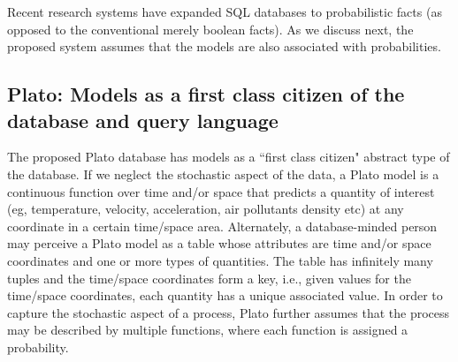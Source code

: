 Recent research systems have expanded SQL databases to probabilistic facts (as opposed to the conventional merely boolean facts). As we discuss next, the proposed system assumes that the models are also associated with probabilities.


\subsection{Plato: Models as a first class citizen of the database and query language}
\label{sec:plato}
The proposed Plato database has models as a ``first class citizen" abstract type of the database. If we neglect the stochastic aspect of the data, a Plato model is a continuous function over time and/or space that predicts a quantity of interest (eg, temperature, velocity, acceleration, air pollutants density etc) at any coordinate in a certain time/space area. Alternately, a database-minded person may perceive a Plato model as a table whose attributes are time and/or space coordinates and one or more types of quantities. The table has infinitely many tuples and the time/space coordinates form a key, i.e.,  given values for the time/space coordinates, each quantity has a unique associated value. 
In order to capture the stochastic aspect of a process, Plato further assumes that the process may be described by multiple functions, where each function is assigned a probability.


